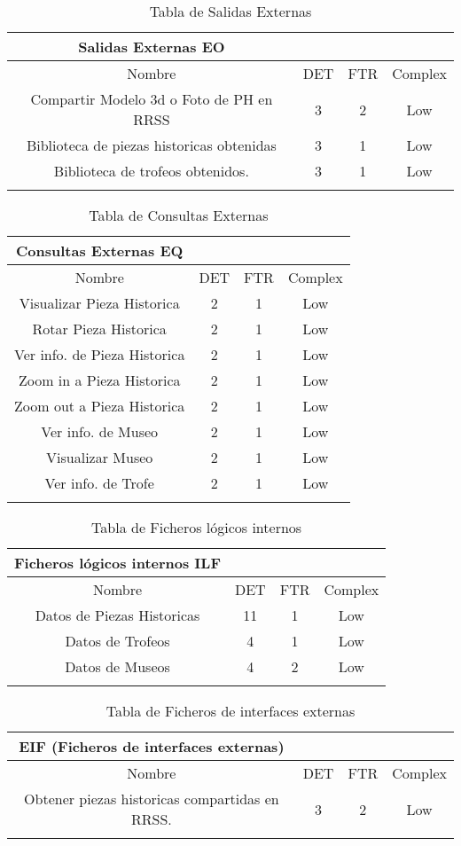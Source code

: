 \begin{longtable}{|c|c|c|c|}
 \hline 
 Salidas Externas EO &   &   &   \\ 
 \hline 
 Nombre & DET & FTR & Complex \\ 
 \hline 
 Compartir Modelo 3d o Foto de PH en RRSS & 3 & 2 & Low \\ 
 \hline 
 Biblioteca de piezas historicas obtenidas & 3 & 1 & Low \\ 
 \hline 
 Biblioteca de trofeos obtenidos. & 3 & 1 & Low \\ 
 \hline 
 \caption{Tabla de Salidas Externas}
\label{tab5}
 \end{longtable}
 
 \begin{longtable}{|c|c|c|c|}
  \hline 
  Consultas Externas EQ &  &  &  \\ 
  \hline 
  Nombre & DET & FTR & Complex \\ 
  \hline 
  Visualizar Pieza Historica & 2 & 1 & Low \\ 
  \hline 
  Rotar Pieza Historica & 2 & 1 & Low \\ 
  \hline 
  Ver info. de Pieza Historica & 2 & 1 & Low \\ 
  \hline 
  Zoom in a Pieza Historica & 2 & 1 & Low \\ 
  \hline 
  Zoom out a Pieza Historica & 2 & 1 & Low \\ 
  \hline 
  Ver info. de Museo & 2 & 1 & Low \\ 
  \hline 
  Visualizar Museo & 2 & 1 & Low \\ 
  \hline 
  Ver info. de Trofe & 2 & 1 & Low \\ 
  \hline 
  \caption{Tabla de Consultas Externas}
  \label{tab6}
  \end{longtable} 
  
  \begin{longtable}{|c|c|c|c|}
   \hline 
   Ficheros lógicos internos ILF &  &  &  \\ 
   \hline 
   Nombre & DET & FTR & Complex \\ 
   \hline 
   Datos de Piezas Historicas & 11 & 1 & Low \\ 
   \hline 
   Datos de Trofeos & 4 & 1 & Low \\ 
   \hline 
   Datos de Museos & 4 & 2 & Low \\ 
   \hline
   \caption{Tabla de Ficheros lógicos internos}
   \label{tab7} 
   \end{longtable}  
   
   \begin{longtable}{|c|c|c|c|}
   \hline 
   EIF (Ficheros de interfaces externas) &  &  &  \\ 
   \hline 
   Nombre & DET & FTR & Complex \\ 
   \hline 
   Obtener piezas historicas compartidas en RRSS. & 3 & 2 & Low \\ 
   \hline 
   \caption{Tabla de Ficheros de interfaces externas}
   \label{tab8} 
   \end{longtable} 
   
